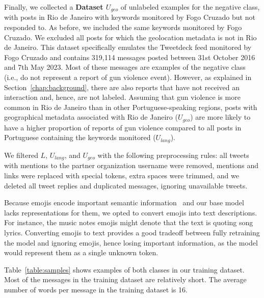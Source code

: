 \documentclass[11pt,letterpaper]{article}
\begin{document}
Finally, we collected a \textbf{Dataset $U_{geo}$} of unlabeled examples for the negative class, with posts in Rio de Janeiro with keywords monitored by Fogo Cruzado but not responded to. As before, we included the same keywords monitored by Fogo Cruzado. We excluded all posts for which the geolocation metadata is not in Rio de Janeiro. This dataset specifically emulates the Tweetdeck feed monitored by Fogo Cruzado and contains 319,114 messages posted between 31st October 2016 and 7th May 2023. Most of these messages are examples of the negative class (i.e., do not represent a report of gun violence event). However, as explained in Section~\ref{chap:background}, there are also reports that have not received an interaction and, hence, are not labeled. Assuming that gun violence is more common in Rio de Janeiro than in other Portuguese-speaking regions, posts with geographical metadata associated with Rio de Janeiro ($ U_{geo}$) are more likely to have a higher proportion of reports of gun violence compared to all posts in Portuguese containing the keywords monitored ($ U_{lang}$). 

We filtered $L$, $U_{lang}$, and $U_{geo}$ with the following preprocessing rules: all tweets with mentions to the partner organization username were removed, mentions and links were replaced with special tokens, extra spaces were trimmed, and we deleted all tweet replies and duplicated messages, ignoring unavailable tweets. 

Because emojis encode important semantic information~\citep{kirk-etal-2022-hatemoji} and our base model~\citep{souzaBERTimbauPretrainedBERT2020} lacks representations for them, we opted to convert emojis into text descriptions. For instance, the music notes emojis might denote that the text is quoting song lyrics. Converting emojis to text provides a good tradeoff between fully retraining the model and ignoring emojis, hence losing important information, as the model would represent them as a single unknown token.

Table~\ref{table:samples} shows examples of both classes in our training dataset. Most of the messages in the training dataset are relatively short. The average number of words per message in the training dataset is 16.
\end{document}
